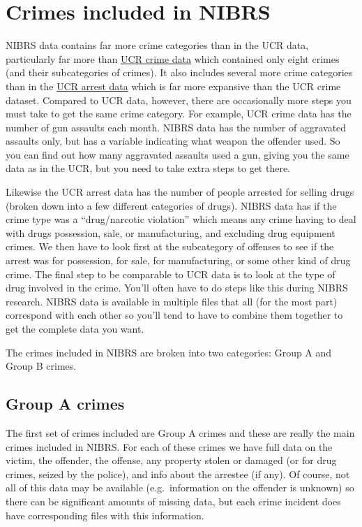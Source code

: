 \documentclass[
  12pt,
  openany]{book}
\begin{document}
\section{Crimes included in NIBRS}\label{crimes-included-in-nibrs}

NIBRS data contains far more crime categories than in the UCR data, particularly far more than \href{https://ucrbook.com/ucrGeneral.html\#crimes-in-the-offenses-known-and-clearances-by-arrest-dataset}{UCR crime data} which contained only eight crimes (and their subcategories of crimes). It also includes several more crime categories than in the \href{https://ucrbook.com/ucrGeneral.html\#crimes-in-the-arrests-by-age-sex-and-race-dataset}{UCR arrest data} which is far more expansive than the UCR crime dataset. Compared to UCR data, however, there are occasionally more steps you must take to get the same crime category. For example, UCR crime data has the number of gun assaults each month. NIBRS data has the number of aggravated assaults only, but has a variable indicating what weapon the offender used. So you can find out how many aggravated assaults used a gun, giving you the same data as in the UCR, but you need to take extra steps to get there.

Likewise the UCR arrest data has the number of people arrested for selling drugs (broken down into a few different categories of drugs). NIBRS data has if the crime type was a ``drug/narcotic violation'' which means any crime having to deal with drugs possession, sale, or manufacturing, and excluding drug equipment crimes. We then have to look first at the subcategory of offenses to see if the arrest was for possession, for sale, for manufacturing, or some other kind of drug crime. The final step to be comparable to UCR data is to look at the type of drug involved in the crime. You'll often have to do steps like this during NIBRS research. NIBRS data is available in multiple files that all (for the most part) correspond with each other so you'll tend to have to combine them together to get the complete data you want.

The crimes included in NIBRS are broken into two categories: Group A and Group B crimes.

\subsection{Group A crimes}\label{group-a-crimes}

The first set of crimes included are Group A crimes and these are really the main crimes included in NIBRS. For each of these crimes we have full data on the victim, the offender, the offense, any property stolen or damaged (or for drug crimes, seized by the police), and info about the arrestee (if any). Of course, not all of this data may be available (e.g.~information on the offender is unknown) so there can be significant amounts of missing data, but each crime incident does have corresponding files with this information.
\end{document}
